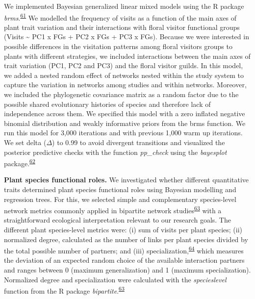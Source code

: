 \documentclass[
  12pt,
  a4paper,
]{article}
\begin{document}
We implemented Bayesian generalized linear mixed models using the R package \emph{brms}.\textsuperscript{\protect\hyperlink{ref-burkner2017}{61}} We modelled the frequency of visits as a function of the main axes of plant trait variation and their interactions with floral visitor functional groups (Visits \textasciitilde{} PC1 x FGs + PC2 x FGs + PC3 x FGs). Because we were interested in possible differences in the visitation patterns among floral visitors groups to plants with different strategies, we included interactions between the main axes of trait variation (PC1, PC2 and PC3) and the floral visitor guilds. In this model, we added a nested random effect of networks nested within the study system to capture the variation in networks among studies and within networks. Moreover, we included the phylogenetic covariance matrix as a random factor due to the possible shared evolutionary histories of species and therefore lack of independence across them. We specified this model with a zero inflated negative binomial distribution and weakly informative priors from the brms function. We run this model for 3,000 iterations and with previous 1,000 warm up iterations. We set delta (\(\Delta\)) to 0.99 to avoid divergent transitions and visualized the posterior predictive checks with the function \emph{pp\_check} using the \emph{bayesplot} package.\textsuperscript{\protect\hyperlink{ref-gabry2019}{62}}

\textbf{Plant species functional roles.} We investigated whether different quantitative traits determined plant species functional roles using Bayesian modelling and regression trees. For this, we selected simple and complementary species-level network metrics commonly applied in bipartite network studies\textsuperscript{\protect\hyperlink{ref-dormann2008}{63}} with a straightforward ecological interpretation relevant to our research goals. The different plant species-level metrics were: (i) sum of visits per plant species; (ii) normalized degree, calculated as the number of links per plant species divided by the total possible number of partners; and (iii) specialization,\textsuperscript{\protect\hyperlink{ref-bluthgen2006}{64}} which measures the deviation of an expected random choice of the available interaction partners and ranges between 0 (maximum generalization) and 1 (maximum specialization). Normalized degree and specialization were calculated with the \emph{specieslevel} function from the R package \emph{bipartite}.\textsuperscript{\protect\hyperlink{ref-dormann2008}{63}}
\end{document}
